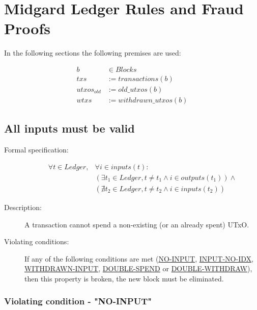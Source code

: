 \documentclass[../main.tex]{subfiles}
\begin{document}
\section{Midgard Ledger Rules and Fraud Proofs}
\label{sec:ledger-rules-fraud-proofs}

In the following sections the following premises are used:

\begin{equation*}
\begin{split}
           b & \in Blocks             \\
         txs & := transactions(b)     \\
 utxos_{old} & := old\_utxos(b)       \\
        wtxs & := withdrawn\_utxos(b)
\end{split}
\end{equation*}

\subsection{All inputs must be valid}

\begin{description}

\item[Formal specification:]
\begin{equation*}
\begin{split}
    \forall t \in Ledger, &\forall i \in inputs(t): \\
    &( \exists t_1 \in Ledger, t \neq t_1 \land i \in outputs(t_1) ) \land \\
    &( \nexists t_2 \in Ledger, t \neq t_2 \land i \in inputs(t_2) )
\end{split}
\end{equation*}

\item[Description:] A transaction cannot spend a non-existing (or an already spent) UTxO.
\item[Violating conditions:] If any of the following conditions are met (\hyperref[sec:NO-INPUT]{NO-INPUT}, \hyperref[sec:INPUT-NO-IDX]{INPUT-NO-IDX}, \hyperref[sec:WITHDRAWN-INPUT]{WITHDRAWN-INPUT}, \hyperref[sec:DOUBLE-SPEND]{DOUBLE-SPEND} or \hyperref[sec:DOUBLE-WITHDRAW]{DOUBLE-WITHDRAW}), then this property is broken, the new block must be eliminated.

\end{description}

\subsubsection{Violating condition - "NO-INPUT"}
\label{sec:NO-INPUT}
\end{document}
